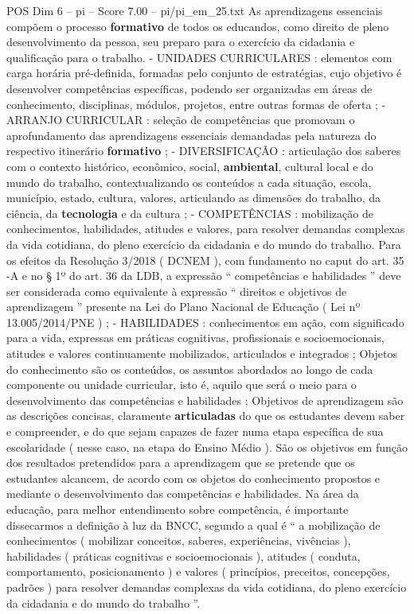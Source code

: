\begin{textsample}{POS Dim 6 – pi – Score 7.00 – pi/pi\_em\_25.txt}
As aprendizagens essenciais compõem o processo \textbf{formativo} de todos os educandos, como direito de pleno desenvolvimento da pessoa, seu preparo para o exercício da cidadania e qualificação para o trabalho. - UNIDADES CURRICULARES : elementos com carga horária pré-definida, formadas pelo conjunto de estratégias, cujo objetivo é desenvolver competências específicas, podendo ser organizadas em áreas de conhecimento, disciplinas, módulos, projetos, entre outras formas de oferta ; - ARRANJO CURRICULAR : seleção de competências que promovam o aprofundamento das aprendizagens essenciais demandadas pela natureza do respectivo itinerário \textbf{formativo} ; - DIVERSIFICAÇÃO : articulação dos saberes com o contexto histórico, econômico, social, \textbf{ambiental}, cultural local e do mundo do trabalho, contextualizando os conteúdos a cada situação, escola, município, estado, cultura, valores, articulando as dimensões do trabalho, da ciência, da \textbf{tecnologia} e da cultura ; - COMPETÊNCIAS : mobilização de conhecimentos, habilidades, atitudes e valores, para resolver demandas complexas da vida cotidiana, do pleno exercício da cidadania e do mundo do trabalho.
Para os efeitos da Resolução 3/2018 ( DCNEM ), com fundamento no caput do art. 35 -A e no § 1º do art. 36 da LDB, a expressão “ competências e habilidades ” deve ser considerada como equivalente à expressão “ direitos e objetivos de aprendizagem ” presente na Lei do Plano Nacional de Educação ( Lei nº 13.005/2014/PNE ) ; - HABILIDADES : conhecimentos em ação, com significado para a vida, expressas em práticas cognitivas, profissionais e socioemocionais, atitudes e valores continuamente mobilizados, articulados e integrados ; Objetos do conhecimento são os conteúdos, os assuntos abordados ao longo de cada componente ou unidade curricular, isto é, aquilo que será o meio para o desenvolvimento das competências e habilidades ; Objetivos de aprendizagem são as descrições concisas, claramente \textbf{articuladas} do que os estudantes devem saber e compreender, e do que sejam capazes de fazer numa etapa específica de sua escolaridade ( nesse caso, na etapa do Ensino Médio ).
São os objetivos em função dos resultados pretendidos para a aprendizagem que se pretende que os estudantes alcancem, de acordo com os objetos do conhecimento propostos e mediante o desenvolvimento das competências e habilidades.
Na área da educação, para melhor entendimento sobre competência, é importante dissecarmos a definição à luz da BNCC, segundo a qual é “ a mobilização de conhecimentos ( mobilizar conceitos, saberes, experiências, vivências ), habilidades ( práticas cognitivas e socioemocionais ), atitudes ( conduta, comportamento, posicionamento ) e valores ( princípios, preceitos, concepções, padrões ) para resolver demandas complexas da vida cotidiana, do pleno exercício da cidadania e do mundo do trabalho ”.

\end{textsample}
